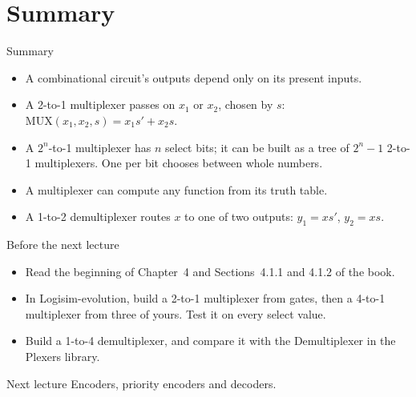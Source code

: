 \documentclass[10pt]{wosm-slides}
\begin{document}
\section{Summary}

\begin{frame}{Summary}
  \begin{itemize}
    \item A combinational circuit's outputs depend only on its present inputs.
    \item A 2-to-1 multiplexer passes on $x_1$ or $x_2$, chosen by $s$:
      $\mathrm{MUX}(x_1, x_2, s) = x_1 s' + x_2 s$.
    \item A $2^n$-to-1 multiplexer has $n$ select bits; it can be built as a tree of
      $2^n - 1$ 2-to-1 multiplexers. One per bit chooses between whole numbers.
    \item A multiplexer can compute any function from its truth table.
    \item A 1-to-2 demultiplexer routes $x$ to one of two outputs: $y_1 = x s'$,
      $y_2 = x s$.
  \end{itemize}
\end{frame}

\begin{frame}{Before the next lecture}
  \begin{itemize}
    \item Read the beginning of Chapter~4 and Sections~4.1.1 and 4.1.2 of the book.
    \item In Logisim-evolution, build a 2-to-1 multiplexer from gates, then a
      4-to-1 multiplexer from three of yours. Test it on every select value.
    \item Build a 1-to-4 demultiplexer, and compare it with the Demultiplexer in
      the Plexers library.
  \end{itemize}

  \begin{block}{Next lecture }
    Encoders, priority encoders and decoders.
  \end{block}
\end{frame}
\end{document}
